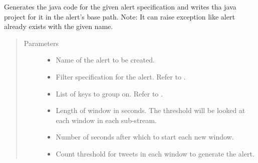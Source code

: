\documentclass[letterpaper,10pt,english]{sphinxmanual}
\begin{document}
\begin{fulllineitems}
\begin{fulllineitems}
\end{fulllineitems}


\begin{fulllineitems}
\label{\detokenize{flink:flink_code_gen.FlinkCodeGenerator.write_code}}
Generates the java code for the given alert specification and writes tha java project for it in the alert’s base path.
Note: It can raise exception like alert already exists with the given name.
\begin{quote}\begin{description}
\item[{Parameters}] \leavevmode\begin{itemize}
\item {} 
 \textendash{} Name of the alert to be created.

\item {} 
 \textendash{} Filter specification for the alert. Refer to .

\item {} 
 \textendash{} List of keys to group on. Refer to .

\item {} 
 \textendash{} Length of window in seconds. The threshold will be looked at each window in each sub-stream.

\item {} 
 \textendash{} Number of seconds after which to start each new window.

\item {} 
 \textendash{} Count threshold for tweets in each window to generate the alert.

\end{itemize}

\end{description}\end{quote}

\end{fulllineitems}


\end{fulllineitems}
\end{document}

